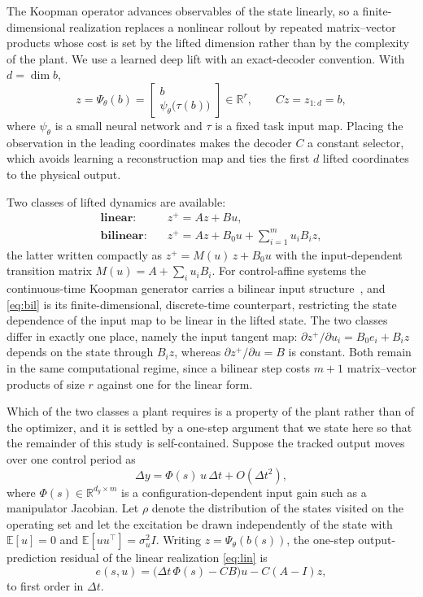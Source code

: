 \documentclass[letterpaper,10pt,conference]{ieeeconf}
\begin{document}
The Koopman operator advances observables of the state linearly, so a finite-dimensional realization replaces a nonlinear rollout by repeated matrix--vector products whose cost is set by the lifted dimension rather than by the complexity of the plant.
We use a learned deep lift with an exact-decoder convention. With $d = \dim b$,
\begin{equation}
z = \Psi_\theta(b) =
\begin{bmatrix} b \\ \psi_\theta\big(\tau(b)\big) \end{bmatrix}
\in \mathbb{R}^{r},
\qquad
C z = z_{1:d} = b,
\label{eq:lift}
\end{equation}
where $\psi_\theta$ is a small neural network and $\tau$ is a fixed task input map.
Placing the observation in the leading coordinates makes the decoder $C$ a constant selector, which avoids learning a reconstruction map and ties the first $d$ lifted coordinates to the physical output.

Two classes of lifted dynamics are available:
\begin{align}
\textbf{linear:}\quad
& z^{+} = A z + B u ,
\label{eq:lin}\\[2pt]
\textbf{bilinear:}\quad
& z^{+} = A z + B_0 u + \sum_{i=1}^{m} u_i B_i z ,
\label{eq:bil}
\end{align}
the latter written compactly as $z^{+} = M(u)\, z + B_0 u$ with the input-dependent transition matrix $M(u) = A + \sum_i u_i B_i$.
For control-affine systems the continuous-time Koopman generator carries a bilinear input structure~\cite{iacob2024}, and \eqref{eq:bil} is its finite-dimensional, discrete-time counterpart, restricting the state dependence of the input map to be linear in the lifted state.
The two classes differ in exactly one place, namely the input tangent map: $\partial z^{+} / \partial u_i = B_0 e_i + B_i z$ depends on the state through $B_i z$, whereas $\partial z^{+}/\partial u = B$ is constant.
Both remain in the same computational regime, since a bilinear step costs $m+1$ matrix--vector products of size $r$ against one for the linear form.

Which of the two classes a plant requires is a property of the plant rather than of the optimizer, and it is settled by a one-step argument that we state here so that the remainder of this study is self-contained.
Suppose the tracked output moves over one control period as
\begin{equation}
\Delta y = \Phi(s)\, u\, \Delta t + O(\Delta t^{2}),
\label{eq:gain}
\end{equation}
where $\Phi(s) \in \mathbb{R}^{d_y \times m}$ is a configuration-dependent input gain such as a manipulator Jacobian.
Let $\rho$ denote the distribution of the states visited on the operating set and let the excitation be drawn independently of the state with $\mathbb{E}[u] = 0$ and $\mathbb{E}[u u^{\top}] = \sigma_u^{2} I$.
Writing $z = \Psi_\theta(b(s))$, the one-step output-prediction residual of the linear realization \eqref{eq:lin} is
\begin{equation}
e(s, u) = \big(\Delta t\, \Phi(s) - C B\big) u - C(A - I) z ,
\label{eq:residual}
\end{equation}
to first order in $\Delta t$.
\end{document}
